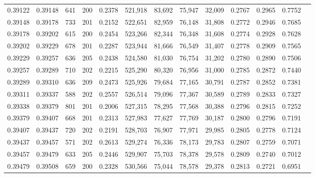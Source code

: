 \begin{tabular}{rrrrrrrrrrrrr}
0.39122 & 0.39148 &   641 & 200 &                                     0.2378 & 521,918 &  83,692 &  75,947 &  32,009 & 0.2767 & 0.2965 & 0.7752 \\
0.39148 & 0.39178 &   733 & 201 &                                     0.2152 & 522,651 &  82,959 &  76,148 &  31,808 & 0.2772 & 0.2946 & 0.7685 \\
0.39178 & 0.39202 &   615 & 200 &                                     0.2454 & 523,266 &  82,344 &  76,348 &  31,608 & 0.2774 & 0.2928 & 0.7628 \\
0.39202 & 0.39229 &   678 & 201 &                                     0.2287 & 523,944 &  81,666 &  76,549 &  31,407 & 0.2778 & 0.2909 & 0.7565 \\
0.39229 & 0.39257 &   636 & 205 &                                     0.2438 & 524,580 &  81,030 &  76,754 &  31,202 & 0.2780 & 0.2890 & 0.7506 \\
0.39257 & 0.39289 &   710 & 202 &                                     0.2215 & 525,290 &  80,320 &  76,956 &  31,000 & 0.2785 & 0.2872 & 0.7440 \\
0.39289 & 0.39310 &   636 & 209 &                                     0.2473 & 525,926 &  79,684 &  77,165 &  30,791 & 0.2787 & 0.2852 & 0.7381 \\
0.39311 & 0.39337 &   588 & 202 &                                     0.2557 & 526,514 &  79,096 &  77,367 &  30,589 & 0.2789 & 0.2833 & 0.7327 \\
0.39338 & 0.39379 &   801 & 201 &                                     0.2006 & 527,315 &  78,295 &  77,568 &  30,388 & 0.2796 & 0.2815 & 0.7252 \\
0.39379 & 0.39407 &   668 & 201 &                                     0.2313 & 527,983 &  77,627 &  77,769 &  30,187 & 0.2800 & 0.2796 & 0.7191 \\
0.39407 & 0.39437 &   720 & 202 &                                     0.2191 & 528,703 &  76,907 &  77,971 &  29,985 & 0.2805 & 0.2778 & 0.7124 \\
0.39437 & 0.39457 &   571 & 202 &                                     0.2613 & 529,274 &  76,336 &  78,173 &  29,783 & 0.2807 & 0.2759 & 0.7071 \\
0.39457 & 0.39479 &   633 & 205 &                                     0.2446 & 529,907 &  75,703 &  78,378 &  29,578 & 0.2809 & 0.2740 & 0.7012 \\
0.39479 & 0.39508 &   659 & 200 &                                     0.2328 & 530,566 &  75,044 &  78,578 &  29,378 & 0.2813 & 0.2721 & 0.6951 \\

\end{tabular}

